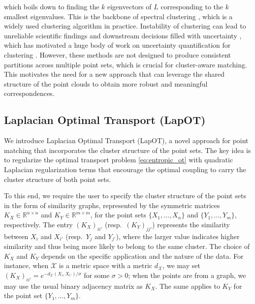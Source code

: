 \documentclass{article}
\theoremstyle{definition}
\newcommand{\cX}{\mathcal{X}}
\newcommand{\R}{\mathbb{R}}
\begin{document}
which boils down to finding the $k$ eigenvectors of $L$ corresponding to the $k$ smallest eigenvalues. This is the backbone of spectral clustering \cite{belkin2001laplacian,coifman2006diffusion,von2007tutorial}, which is a widely used clustering algorithm in practice. Instability of clustering \cite{ben2006sober,rakhlin2006stability,von2010clustering} can lead to unreliable scientific findings and downstream decisions filled with uncertainty \cite{senbabaouglu2014critical, smith2025lack}, which has motivated a huge body of work on uncertainty quantification for clustering \cite{kerr2001bootcluster, hofmans2015bootstrapkmeans,liu2018ukmeans,huang2015statistical,wade2018bayesian,hur2026inference,nath2026weighted}. However, these methods are not designed to produce consistent partitions across multiple point sets, which is crucial for cluster-aware matching. This motivates the need for a new approach that can leverage the shared structure of the point clouds to obtain more robust and meaningful correspondences.


\subsection{Laplacian Optimal Transport (LapOT)}
We introduce Laplacian Optimal Transport (LapOT), a novel approach for point matching that incorporates the cluster structure of the point sets. The key idea is to regularize the optimal transport problem \eqref{eq:entropic_ot} with quadratic Laplacian regularization terms that encourage the optimal coupling to carry the cluster structure of both point sets. 

To this end, we require the user to specify the cluster structure of the point sets in the form of similarity graphs, represented by the symmetric matrices $K_X \in \R^{n \times n}$ and $K_Y \in \R^{m \times m}$, for the point sets $\{X_1, \ldots, X_n\}$ and $\{Y_1, \ldots, Y_m\}$, respectively. The entry $(K_X)_{i i'}$ (resp.\ $(K_Y)_{j j'}$) represents the similarity between $X_i$ and $X_{i'}$ (resp.\ $Y_j$ and $Y_{j'}$), where the larger value indicates higher similarity and thus being more likely to belong to the same cluster. The choice of $K_X$ and $K_Y$ depends on the specific application and the nature of the data. For instance, when $\cX$ is a metric space with a metric $d_\cX$, we may set $(K_X)_{i i'} = e^{-d_\cX(X_i, X_{i'}) / \sigma}$ for some $\sigma > 0$; when the points are from a graph, we may use the usual binary adjacency matrix as $K_X$. The same applies to $K_Y$ for the point set $\{Y_1, \ldots, Y_m\}$.
\end{document}
